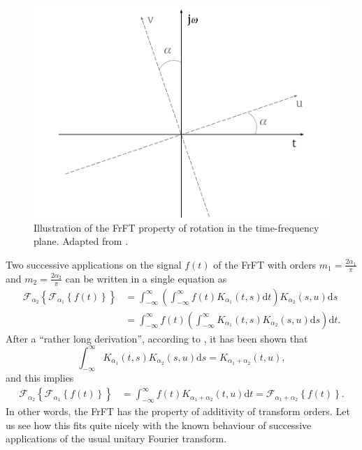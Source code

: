 \begin{figure}
\centering
\includegraphics[width=0.65\linewidth]{Figures/FrFT-Rotation-cropped.pdf}
\caption{Illustration of the FrFT property of rotation in the time-frequency plane. Adapted from \cite{almeida1994fractional}.}
\label{fig:frft_rotation}
\end{figure}

Two successive applications on the signal $f(t)$ of the FrFT with orders $m_1 = \frac{2\alpha_1}{\pi}$ and $m_2 = \frac{2\alpha_2}{\pi}$ can be written in a single equation as
\begin{align}
\label{eq:frftsucessive}
\mathcal{F}_{\alpha_2} \left\{ \mathcal{F}_{\alpha_1} \left\{ f(t) \right\} \right\} &=
\int_{-\infty}^{\infty} 
\left( \int_{-\infty}^{\infty} f(t) K_{\alpha_1} (t, s) \mathrm{d}t \right)
K_{\alpha_2} (s, u) \mathrm{d}s \\
&= 
\int_{-\infty}^{\infty}
f(t)
\left(
\int_{-\infty}^{\infty}
K_{\alpha_1} (t, s) K_{\alpha_2} (s, u) \mathrm{d}s
\right)
\mathrm{d}t.
\end{align}
After a ``rather long derivation'', according to \cite{almeida1994fractional}, it has been shown that
\begin{equation}
\label{eq:summingangles}
\int_{-\infty}^{\infty}
K_{\alpha_1} (t, s) K_{\alpha_2} (s, u) \mathrm{d}s = 
K_{\alpha_1 + \alpha_2} (t, u),
\end{equation}
and this implies
\begin{align}
\mathcal{F}_{\alpha_2} \left\{ \mathcal{F}_{\alpha_1} \left\{ f(t) \right\} \right\} &=
\int_{-\infty}^{\infty}
f(t)
K_{\alpha_1 + \alpha_2} (t, u)
\mathrm{d}t
= \mathcal{F}_{\alpha_1 + \alpha_2} \left\{ f(t) \right\}.
\end{align}
In other words, the FrFT has the property of additivity of transform orders. Let us see how this fits quite nicely with the known behaviour of successive applications of the usual unitary Fourier transform.

